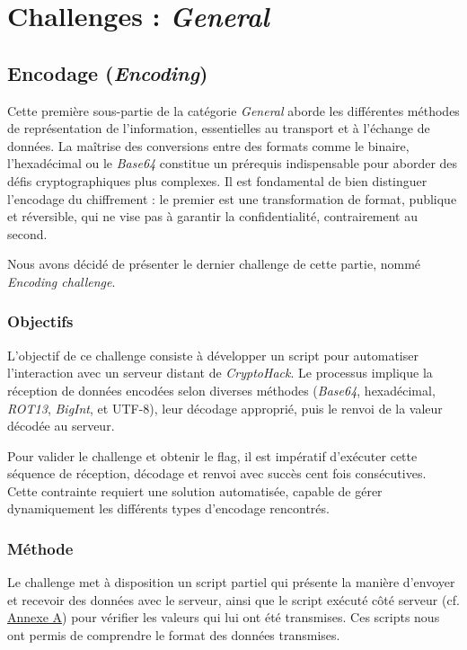 \section{Challenges : \textit{General}}


\subsection{Encodage (\textit{Encoding})}

Cette première sous-partie de la catégorie \textit{General} aborde les différentes
méthodes de représentation de l'information, essentielles au transport
et à l'échange de données. La maîtrise des conversions entre des formats
comme le binaire, l'hexadécimal ou le \textit{Base64} constitue un prérequis
indispensable pour aborder des défis cryptographiques plus complexes. Il
est fondamental de bien distinguer l'encodage du chiffrement : le premier
est une transformation de format, publique et réversible, qui ne vise pas
à garantir la confidentialité, contrairement au second.

Nous avons décidé de présenter le dernier challenge de cette partie,
nommé \textit{Encoding challenge}.

\subsubsection{Objectifs}
L'objectif de ce challenge consiste à développer un script pour
automatiser l'interaction avec un serveur distant de \textit{CryptoHack}. Le
processus implique la réception de données encodées selon diverses
méthodes (\textit{Base64}, hexadécimal, \textit{ROT13}, \textit{BigInt}, et UTF-8), leur décodage
approprié, puis le renvoi de la valeur décodée au serveur.

Pour valider le challenge et obtenir le flag, il est impératif d'exécuter
cette séquence de réception, décodage et renvoi avec succès cent fois
consécutives. Cette contrainte requiert une solution
automatisée, capable de gérer dynamiquement les différents types
d'encodage rencontrés.

\subsubsection{Méthode}
Le challenge met à disposition un script partiel qui présente la manière
d'envoyer et recevoir des données avec le serveur, ainsi que le script
exécuté côté serveur (cf. \hyperref[annexe:script-server-encoding]{Annexe A}) pour vérifier les valeurs qui lui ont été
transmises. Ces scripts nous ont permis de comprendre le format des
données transmises.


